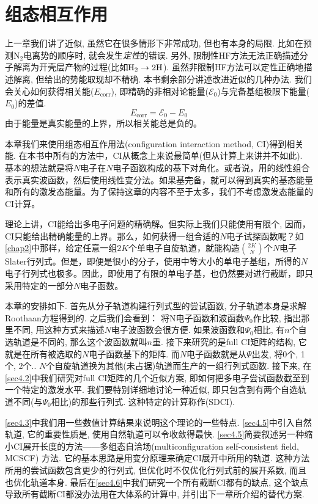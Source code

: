 \chapter{组态相互作用}
上一章我们讲了\hft 近似, 虽然它在很多情形下非常成功, 但也有本身的局限. \hft 比如在预测$\text{N}_2$电离势的顺序时, 就会发生\emph{定性}的错误. 另外, 限制性HF方法无法正确描述分子解离为开壳层产物的过程(比如$\mathrm{H}_2\to2\text{H}$). 虽然非限制HF方法可以定性正确地描述解离, 但给出的势能取现却不精确. 本书剩余部分讲述改进\hft 近似的几种办法. 我们会关心如何获得相关能($E_\mathrm{corr}$), 即精确的非相对论能量($\mathscr{E}_0$)与完备基组极限下\hft 能量($E_0$)的差值.
\begin{equation}
E_\mathrm{corr}=\mathscr{E}_0-E_0
\end{equation}
由于\hft 能量是真实能量的上界，所以相关能总是负的。

本章我们来使用组态相互作用法(configuration interaction method, CI)得到相关能. 在本书中所有的方法中，CI从概念上来说最简单(但从计算上来讲并不如此). 基本的想法就是将$N$电子\ha 在$N$电子函数构成的基下对角化。或者说，用的线性组合表示真实波函数，然后使用线性变分法。如果基完备，就可以得到真实的基态能量和所有的激发态能量。为了保持这章的内容不至于太多，我们不考虑激发态能量的CI计算。

理论上讲，CI能给出多电子问题的精确解。但实际上我们只能使用有限个, 因而，CI只能给出精确能量的上界。那么，如何获得一组合适的$N$电子试探函数呢？如\ref{chap2}中那样，给定任意一组$2K$个单电子自旋轨道，就能构造$\binom{2K}{N}$个$N$电子Slater行列式。但是，即便是很小的分子，使用中等大小的单电子基组，所得的$N$电子行列式也极多。因此，即使用了有限的单电子基，也仍然要对进行截断，即只采用特定的一部分$N$电子函数。

本章的安排如下. 首先从\hft 分子轨道构建行列式型的尝试函数, 分子轨道本身是求解Roothaan方程得到的. 之后我们会看到： 将N电子函数和\hft 波函数$\Psi_0$作比较, 指出那里不同, 用这种方式来描述$N$电子波函数会很方便. 如果波函数和$\Psi_0$相比, 有$n$个自选轨道是不同的, 那么这个波函数就叫$n$重. 接下来研究的是full CI矩阵的结构, 它就是\ha 在所有被选取的$N$电子函数基下的矩阵. 而$N$电子函数就是从$\Psi$出发, 将0个, 1个, 2个.. $N$个自旋轨道换为其他(未占据)轨道而生产的一组行列式函数. 接下来, 在\ref{sec4.2}中我们研究对full CI矩阵的几个近似方案, 即如何把多电子尝试函数截至到一个特定的激发水平. 我们要特别详细地讨论一种近似, 即只包含到有两个自选轨道不同(与$\Psi_0$相比)的那些行列式. 这种特定的计算称作(SDCI).

\ref{sec4.3}中我们用一些数值计算结果来说明这个理论的一些特点. \ref{sec4.5}中引入自然轨道, 它的重要性质是, 使用自然轨道可以令收敛得最快. \ref{sec4.5}简要叙述另一种缩小CI展开长度的方法——多组态自洽场(multiconfiguration self-consistent field, MCSCF) 方法. 它的基本思路是用变分原理来确定CI展开中所用的轨道. 这种方法所用的尝试函数包含更少的行列式, 但优化时不仅优化行列式前的展开系数, 而且也优化轨道本身. 最后在\ref{sec4.6}中我们研究一个所有截断CI都有的缺点, 这个缺点导致所有截断CI都没办法用在大体系的计算中, 并引出下一章所介绍的替代方案.
